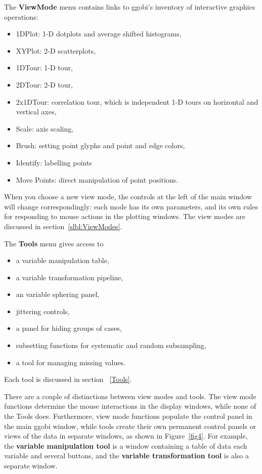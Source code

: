 \documentclass[11pt]{article}
\begin{document}
The {\bf ViewMode} menu contains links to ggobi's
inventory of interactive graphics operations: 
\begin{itemize}
\itemsep 0em
\item 1DPlot: 1-D dotplots and average shifted histograms,
\item XYPlot: 2-D scatterplots,
\item 1DTour: 1-D tour,
\item 2DTour: 2-D tour,
\item 2x1DTour: correlation tour, which is independent 1-D tours on horizontal and vertical axes, 
\item Scale: axis scaling,
\item Brush: setting point glyphs and point and edge colors,
\item Identify: labelling points
\item Move Points: direct manipulation of point positions.
\end{itemize}

When you choose a new view mode, the controls at the left of
the main window will change correspondingly:  each mode has its
own parameters, and its own rules for responding to mouse actions
in the plotting windows.  The view modes
are discussed in section~\ref{slbl:ViewModes}.

The {\bf Tools} menu gives access to 
\begin{itemize}
\itemsep 0em
\item a variable manipulation table,
\item a variable transformation pipeline,
\item an variable sphering panel,
\item jittering controls,
\item a panel for hiding groups of cases,
\item subsetting functions for systematic and random subsampling, 
\item a tool for managing missing values.
\end{itemize}

Each tool is discussed in section ~\ref{Tools}.

There are a couple of distinctions between view modes and tools.  The
view mode functions determine the mouse interactions in the display
windows, while none of the Tools does.  Furthermore, view mode
functions populate the control panel in the main ggobi window, while
tools create their own permanent control panels or views of the data
in separate windows, as shown in Figure~\ref{fig4}.  For example,
the {\bf variable manipulation tool} is a window containing a table of
data each variable and several buttons, and the {\bf variable
transformation tool} is also a separate window.
\end{document}
